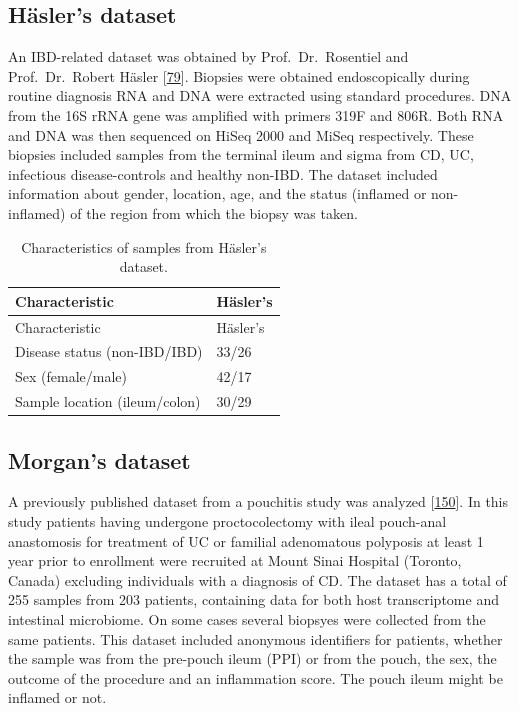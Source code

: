 \documentclass[
  a4paper,
]{book}
\begin{document}
\hypertarget{methods-hasler}{%
\subsection{Häsler's dataset}\label{methods-hasler}}

An IBD-related dataset was obtained by Prof.~Dr.~Rosentiel and Prof.~Dr.~Robert Häsler {[}\protect\hyperlink{ref-hasler_uncoupling_2016}{79}{]}.
Biopsies were obtained endoscopically during routine diagnosis RNA and DNA were extracted using standard procedures.
DNA from the 16S rRNA gene was amplified with primers 319F and 806R.
Both RNA and DNA was then sequenced on HiSeq 2000 and MiSeq respectively.
These biopsies included samples from the terminal ileum and sigma from CD, UC, infectious disease-controls and healthy non-IBD.
The dataset included information about gender, location, age, and the status (inflamed or non-inflamed) of the region from which the biopsy was taken.

\begin{longtable}[]{@{}ll@{}}
\caption{\label{tab:Hasler} Characteristics of samples from Häsler's dataset.}\tabularnewline
\toprule
Characteristic & Häsler's \\
\midrule
\endfirsthead
\toprule
Characteristic & Häsler's \\
\midrule
\endhead
Disease status (non-IBD/IBD) & 33/26 \\
Sex (female/male) & 42/17 \\
Sample location (ileum/colon) & 30/29 \\
\bottomrule
\end{longtable}

\hypertarget{methods-morgan}{%
\subsection{Morgan's dataset}\label{methods-morgan}}

A previously published dataset from a pouchitis study was analyzed {[}\protect\hyperlink{ref-morgan2015}{150}{]}.
In this study patients having undergone proctocolectomy with ileal pouch-anal anastomosis for treatment of UC or familial adenomatous polyposis at least 1 year prior to enrollment were recruited at Mount Sinai Hospital (Toronto, Canada) excluding individuals with a diagnosis of CD.
The dataset has a total of 255 samples from 203 patients, containing data for both host transcriptome and intestinal microbiome.
On some cases several biopsyes were collected from the same patients.
This dataset included anonymous identifiers for patients, whether the sample was from the pre-pouch ileum (PPI) or from the pouch, the sex, the outcome of the procedure and an inflammation score.
The pouch ileum might be inflamed or not.
\end{document}

